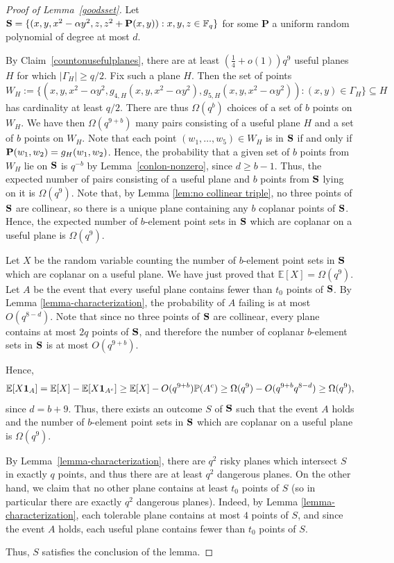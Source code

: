\documentclass[12pt]{article}
\begin{document}
\begin{proof}[Proof of Lemma~\ref{goodsset}] Let $\bold{S} = \{( x, y, x^2 - \alpha y^2, z, z^2 + \textbf{P}(x, y)):x,y,z\in \mathbb{F}_q\}$ for some $\textbf{P}$ a uniform random polynomial of degree at most $d$. 




By Claim~\ref{countonusefulplanes}, there are at least $(\frac{1}{4}+o(1))q^9$ useful planes $H$ for which $|\Gamma_H|\geq q/2$.  Fix such a plane $H$. Then the set of points $$W_H :=\{ (x, y, x^2 - \alpha y^2, g_{4, H}(x, y, x^2 - \alpha y^2), g_{5, H}(x, y, x^2 - \alpha y^2)): (x, y) \in \Gamma_H \} \subseteq H$$
has cardinality at least $q/2$. There are thus $\Omega(q^b)$ choices of a set of $b$ points on $W_H$. We have then $\Omega(q^{9 + b})$ many pairs consisting of a useful plane $H$ and a set of $b$ points on $W_H$. Note that each  point $(w_1, \dots ,w_5)\in W_H$ is in $\bold{S}$ if and only if $\bold{P}(w_1, w_2) = g_H(w_1, w_2)$. 
 Hence, the probability that a given set of $b$ points from $W_H$ 
lie on $\bold{S}$ 
is $q^{-b}$ by Lemma~\ref{conlon-nonzero}, since $d \geq b - 1$. Thus, the expected number of pairs consisting of a useful plane and $b$ points from $\bold{S}$ lying on it is $\Omega(q^9).$ Note that, by Lemma \ref{lem:no collinear triple}, no three points of $\bold{S}$ are collinear, so there is a unique plane containing any $b$ coplanar points of $\bold{S}$. Hence, the expected number of $b$-element point sets in $\bold{S}$ which are coplanar on a useful plane is $\Omega(q^9)$.

Let $X$ be the random variable counting the number of $b$-element point sets in $\bold{S}$ which are coplanar on a useful plane. We have just proved that $\mathbb{E}[X]=\Omega(q^9)$. Let $A$ be the event that every useful plane contains fewer than $t_0$ points of $\bold{S}$. By Lemma \ref{lemma-characterization}, the probability of $A$ failing is at most $O(q^{8 - d})$. Note that since no three points of $\bold{S}$ are collinear, every plane contains at most $2q$ points of $\bold{S}$, and therefore the number of coplanar $b$-element sets in $\bold{S}$ is at most $O(q^{9+b})$.

Hence,
$$\mathbb{E}[X \bold{1}_A]=\mathbb{E}[X]-\mathbb{E}[X \bold{1}_{A^c}]\geq \mathbb{E}[X]-O(q^{9+b})\mathbb{P}(A^c)\geq \Omega(q^9)-O(q^{9+b}q^{8-d})\geq \Omega(q^9),$$
since $d=b+9$. Thus, there exists an outcome $S$ of $\bold{S}$ such that the event $A$ holds and the number of $b$-element point sets in $\bold{S}$ which are coplanar on a useful plane is $\Omega(q^9)$.


By Lemma~\ref{lemma-characterization}, there are $q^2$ risky planes which intersect $S$ in exactly $q$ points, and thus there are at least $q^2$ dangerous planes. On the other hand, we claim that no other plane contains at least $t_0$ points of $S$ (so in particular there are exactly $q^2$ dangerous planes). Indeed, by Lemma \ref{lemma-characterization}, each tolerable plane contains at most $4$ points of $S$, and since the event $A$ holds, each useful plane contains fewer than $t_0$ points of $S$.

Thus, $S$ satisfies the conclusion of the lemma. 
\end{proof}
\end{document}
